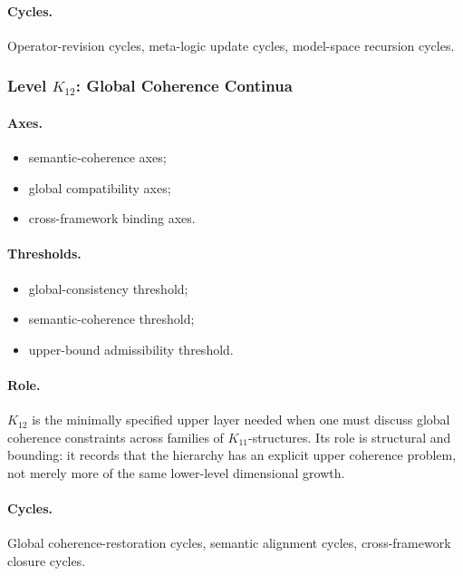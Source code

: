 \paragraph{Cycles.}
Operator-revision cycles, meta-logic update cycles, model-space recursion
cycles.

\subsubsection{Level \(K_{12}\): Global Coherence Continua}

\paragraph{Axes.}
\begin{itemize}
    \item semantic-coherence axes;
    \item global compatibility axes;
    \item cross-framework binding axes.
\end{itemize}

\paragraph{Thresholds.}
\begin{itemize}
    \item global-consistency threshold;
    \item semantic-coherence threshold;
    \item upper-bound admissibility threshold.
\end{itemize}

\paragraph{Role.}
\(K_{12}\) is the minimally specified upper layer needed when one must discuss
global coherence constraints across families of \(K_{11}\)-structures.
Its role is structural and bounding: it records that the hierarchy has an
explicit upper coherence problem, not merely more of the same lower-level
dimensional growth.

\paragraph{Cycles.}
Global coherence-restoration cycles, semantic alignment cycles,
cross-framework closure cycles.


